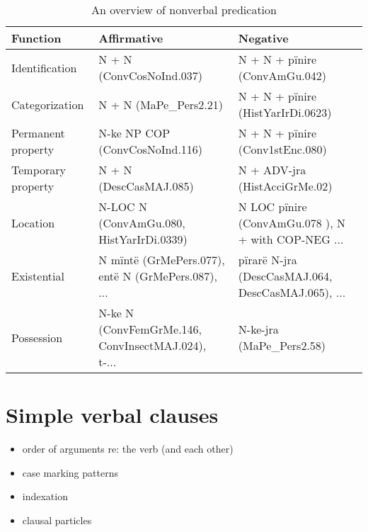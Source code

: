 \documentclass{memoir}
\begin{document}
\begin{table}
\caption{An overview of nonverbal predication}
\label{tab:nvpoverview}
\centering
\begin{tabular}{lll}
\toprule
          Function &                                        Affirmative &                                           Negative \\
\midrule
    Identification &                           N + N (ConvCosNoInd.037) &                      N + N + pïnire (ConvAmGu.042) \\
    Categorization &                             N + N (MaPe\_Pers2.21) &                  N + N + pïnire (HistYarIrDi.0623) \\
Permanent property &                     N-ke NP COP (ConvCosNoInd.116) &                    N + N + pïnire (Conv1stEnc.080) \\
Temporary property &                             N + N (DescCasMAJ.085) &                      N + ADV-jra (HistAcciGrMe.02) \\
          Location &           N-LOC N (ConvAmGu.080, HistYarIrDi.0339) & N LOC pïnire (ConvAmGu.078 ), N + with COP-NEG ... \\
       Existential & N mïntë (GrMePers.077), entë N (GrMePers.087), ... & pïrarë N-jra (DescCasMAJ.064, DescCasMAJ.065), ... \\
        Possession & N-ke N (ConvFemGrMe.146, ConvInsectMAJ.024), t-... &                          N-ke-jra (MaPe\_Pers2.58) \\
\bottomrule
\end{tabular}

\end{table}

\chapter{\texorpdfstring{Simple verbal clauses
\label{simpleverb}}{Simple verbal clauses }}


\begin{itemize}
\tightlist
\item
  order of arguments re: the verb (and each other)
\item
  case marking patterns
\item
  indexation
\item
  clausal particles
\end{itemize}
\end{document}
